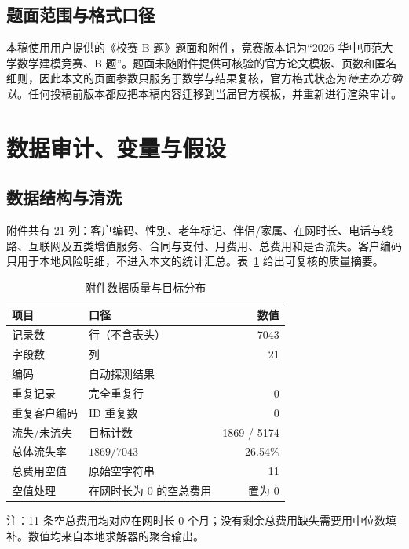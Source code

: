 \documentclass[UTF8,a4paper,11pt]{ctexart}
\newcommand{\code}[1]{\texttt{\detokenize{#1}}}
\begin{document}
\subsection{题面范围与格式口径}
本稿使用用户提供的《校赛 B 题》题面和附件，竞赛版本记为“2026 华中师范大学数学建模竞赛、B 题”。题面未随附件提供可核验的官方论文模板、页数和匿名细则，因此本文的页面参数只服务于数学与结果复核，官方格式状态为\emph{待主办方确认}。任何投稿前版本都应把本稿内容迁移到当届官方模板，并重新进行渲染审计。

\section{数据审计、变量与假设}\label{sec:data}

\subsection{数据结构与清洗}
附件共有 21 列：客户编码、性别、老年标记、伴侣/家属、在网时长、电话与线路、互联网及五类增值服务、合同与支付、月费用、总费用和是否流失。客户编码只用于本地风险明细，不进入本文的统计汇总。表~\ref{tab:quality} 给出可复核的质量摘要。

\begin{table}[H]
\centering
\caption{附件数据质量与目标分布}
\label{tab:quality}
\begin{tabular}{@{}llr@{}}
\toprule
项目 & 口径 & 数值\\
\midrule
记录数 & 行（不含表头） & 7043\\
字段数 & 列 & 21\\
编码 & 自动探测结果 & \code{gb18030}\\
重复记录 & 完全重复行 & 0\\
重复客户编码 & ID 重复数 & 0\\
流失/未流失 & 目标计数 & 1869 / 5174\\
总体流失率 & \(1869/7043\) & 26.54\%\\
总费用空值 & 原始空字符串 & 11\\
空值处理 & 在网时长为 0 的空总费用 & 置为 0\\
\bottomrule
\end{tabular}
\begin{tablenotes}
\footnotesize\item 注：11 条空总费用均对应在网时长 0 个月；没有剩余总费用缺失需要用中位数填补。数值均来自本地求解器的聚合输出。
\end{tablenotes}
\end{table}
\end{document}
